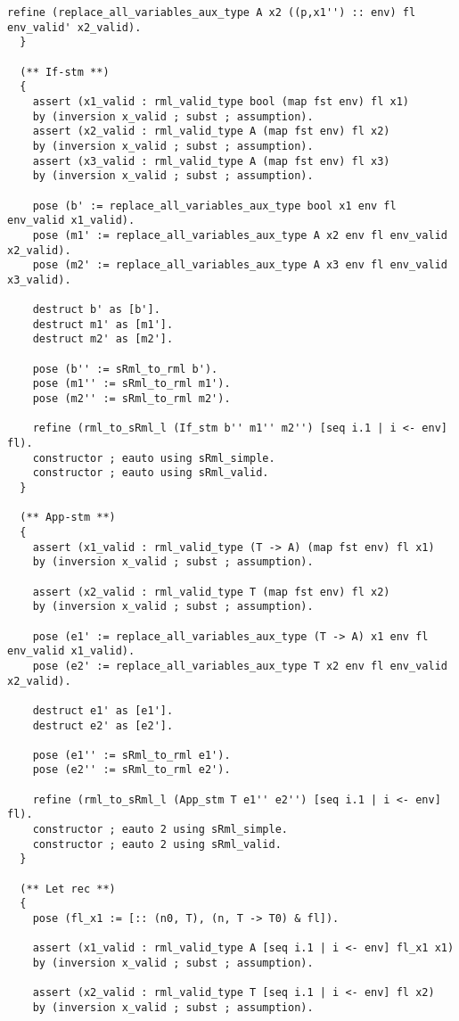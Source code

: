 \documentclass[11pt, leqno, titlepage]{article}
\theoremstyle{definition}
\begin{document}
\begin{appendices}
\begin{lstlisting}[language=coq]
    refine (replace_all_variables_aux_type A x2 ((p,x1'') :: env) fl env_valid' x2_valid).
  }
    
  (** If-stm **)
  {
    assert (x1_valid : rml_valid_type bool (map fst env) fl x1) 
    by (inversion x_valid ; subst ; assumption).
    assert (x2_valid : rml_valid_type A (map fst env) fl x2) 
    by (inversion x_valid ; subst ; assumption).
    assert (x3_valid : rml_valid_type A (map fst env) fl x3) 
    by (inversion x_valid ; subst ; assumption).
    
    pose (b' := replace_all_variables_aux_type bool x1 env fl env_valid x1_valid).
    pose (m1' := replace_all_variables_aux_type A x2 env fl env_valid x2_valid).
    pose (m2' := replace_all_variables_aux_type A x3 env fl env_valid x3_valid).

    destruct b' as [b'].
    destruct m1' as [m1'].
    destruct m2' as [m2'].
    
    pose (b'' := sRml_to_rml b').
    pose (m1'' := sRml_to_rml m1').
    pose (m2'' := sRml_to_rml m2').
    
    refine (rml_to_sRml_l (If_stm b'' m1'' m2'') [seq i.1 | i <- env] fl).
    constructor ; eauto using sRml_simple.
    constructor ; eauto using sRml_valid.
  }

  (** App-stm **)
  {
    assert (x1_valid : rml_valid_type (T -> A) (map fst env) fl x1) 
    by (inversion x_valid ; subst ; assumption).
        
    assert (x2_valid : rml_valid_type T (map fst env) fl x2) 
    by (inversion x_valid ; subst ; assumption).
    
    pose (e1' := replace_all_variables_aux_type (T -> A) x1 env fl env_valid x1_valid).
    pose (e2' := replace_all_variables_aux_type T x2 env fl env_valid x2_valid).

    destruct e1' as [e1'].
    destruct e2' as [e2'].
    
    pose (e1'' := sRml_to_rml e1').
    pose (e2'' := sRml_to_rml e2').
    
    refine (rml_to_sRml_l (App_stm T e1'' e2'') [seq i.1 | i <- env] fl).
    constructor ; eauto 2 using sRml_simple.
    constructor ; eauto 2 using sRml_valid.
  }

  (** Let rec **)
  {
    pose (fl_x1 := [:: (n0, T), (n, T -> T0) & fl]).
    
    assert (x1_valid : rml_valid_type A [seq i.1 | i <- env] fl_x1 x1) 
    by (inversion x_valid ; subst ; assumption).
    
    assert (x2_valid : rml_valid_type T [seq i.1 | i <- env] fl x2) 
    by (inversion x_valid ; subst ; assumption).


\end{lstlisting}
\end{appendices}
\end{document}
